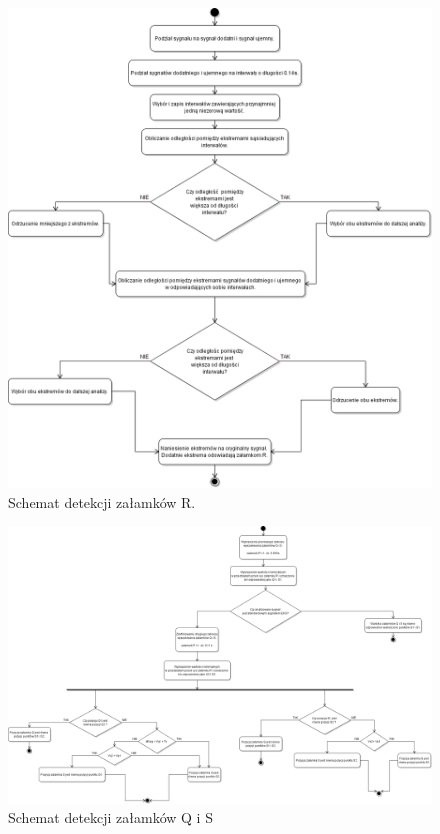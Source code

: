 \documentclass[10pt,a4paper]{article}
\begin{document}
\begin{itemize}
	\begin{figure}
  		\centering
    	\includegraphics[width=1\textwidth]{dom7}
    	\caption{Schemat detekcji załamków R.}
 	 	\label{fig:dom7}
	\end{figure}
		
	\begin{figure}
  		\centering
    	\includegraphics[width=1.2\textwidth, angle =90 ]{dom8}
    	\caption{Schemat detekcji załamków Q i S}
 	 	\label{fig:dom8}
	\end{figure}		
		
	\end{itemize}	
		
\end{document}
